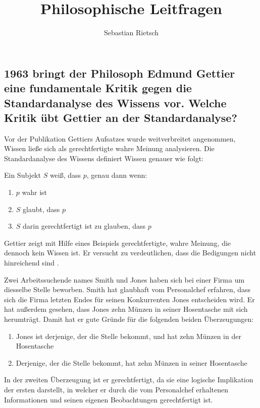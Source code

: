 \documentclass[a4paper]{article}
\title{Philosophische Leitfragen}
\date{}
\author{Sebastian Rietsch}
\begin{document}
\maketitle

\setcounter{section}{2}
\setcounter{subsection}{0}
\subsection{1963 bringt der Philosoph Edmund Gettier eine fundamentale Kritik gegen die Standardanalyse des Wissens vor. Welche Kritik übt Gettier an der Standardanalyse?}
Vor der Publikation Gettiers Aufsatzes wurde weitverbreitet angenommen, Wissen ließe sich als gerechtfertigte wahre Meinung analysieren. Die Standardanalyse des Wissens definiert Wissen genauer wie folgt:

\begin{center}
    Ein Subjekt $S$ weiß, dass $p$, genau dann wenn:
    \begin{enumerate}
        \item
            $p$ wahr ist
        \item
            $S$ glaubt, dass $p$
        \item
            $S$ darin gerechtfertigt ist zu glauben, dass $p$
    \end{enumerate}
\end{center}
Gettier zeigt mit Hilfe eines Beispiels gerechtfertigte, wahre Meinung, die dennoch kein Wissen ist. Er versucht zu verdeutlichen, dass die Bedigungen nicht hinreichend sind \cite{gettier}. 

Zwei Arbeitssuchende names Smith und Jones haben sich bei einer Firma um diesselbe Stelle beworben. Smith hat glaubhaft vom Personalchef erfahren, dass sich die Firma letzten Endes für seinen Konkurrenten Jones entscheiden wird. Er hat außerdem gesehen, dass Jones zehn Münzen in seiner Hosentasche mit sich herumträgt. Damit hat er gute Gründe für die folgenden beiden Überzeugungen:
\begin{enumerate}
    \item
        Jones ist derjenige, der die Stelle bekommt, und hat zehn Münzen in der Hosentasche
    \item
        Derjenige, der die Stelle bekommt, hat zehn Münzen in seiner Hosentasche
\end{enumerate}
In der zweiten Überzeugung ist er gerechtfertigt, da sie eine logische Implikation der ersten darstellt, in welcher er durch die vom Personalchef erhaltenen Informationen und seinen eigenen Beobachtungen gerechtfertigt ist.
\end{document}
